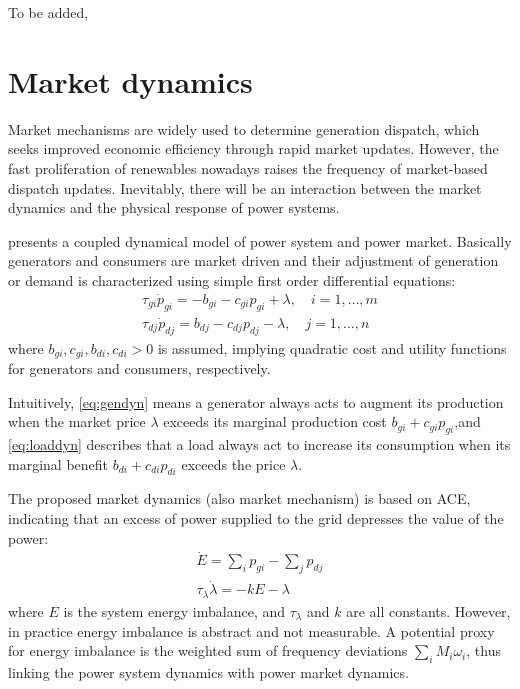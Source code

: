 \documentclass[journal,12pt,onecolumn,draftclsnofoot]{IEEEtran}
\begin{document}
To be added, \cite{wang2017distributed1, wang2017distributed2} 

\section{Market dynamics}

Market mechanisms are widely used to determine generation dispatch, which seeks improved economic efficiency through rapid market updates. However, the fast proliferation of renewables nowadays raises the frequency of market-based dispatch updates. Inevitably, there will be an interaction between the market dynamics and the physical response of power systems.

\cite{alvarado2001stability} presents a coupled dynamical model of power system and power market. Basically generators and consumers are market driven and their adjustment of generation or demand is characterized using simple first order differential equations:
\begin{subequations}
 \begin{eqnarray}
 \label{eq:gendyn}
 \tau_{gi} \dot{p}_{gi} = -b_{gi} -c_{gi} p_{gi} + \lambda, \quad  i=1,\dots,m \\
 \label{eq:loaddyn}
  \tau_{dj} \dot{p}_{dj} = b_{dj} - c_{dj} p_{dj} - \lambda, \quad  j=1,\dots,n
 \end{eqnarray}\label{eq:respdyn}
\end{subequations}
where $b_{gi},c_{gi},b_{di},c_{di}>0$ is assumed, implying quadratic cost and utility functions for generators and consumers, respectively.

Intuitively, \eqref{eq:gendyn} means a generator always acts to augment its production when the market price $\lambda$ exceeds its marginal production cost $b_{gi}+c_{gi}p_{gi}$,and \eqref{eq:loaddyn} describes that a load always act to increase its consumption when its marginal benefit $b_{di}+c_{di}p_{di}$ exceeds the price $\lambda$. 

The proposed market dynamics (also market mechanism) is based on ACE, indicating that an excess of power supplied to the grid depresses the value of the power:
\begin{subequations}
	\begin{eqnarray}
	\dot E=\sum_i p_{gi}-\sum_j p_{dj} \\ 
	\tau_\lambda \dot \lambda = - k E - \lambda	
	\end{eqnarray}\label{eq:mrkctr}
\end{subequations}
where $E$ is the system energy imbalance, and $\tau_\lambda$ and $k$ are all constants. However, in practice energy imbalance is abstract and not measurable.  A potential proxy for energy imbalance is the weighted sum of frequency deviations $\sum_i M_i\omega_i$, thus linking the power system dynamics with power market dynamics.
\end{document}
